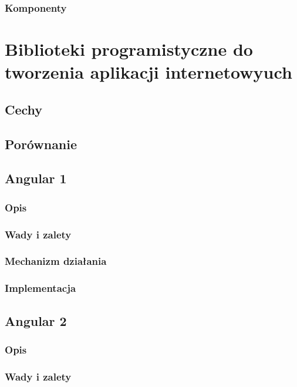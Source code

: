 \documentclass[polish, twoside, 12pt]{mwart}
\let\stdsection\section
\renewcommand*{\section}{\clearpage\stdsection}
\begin{document}
\subsubsection{Komponenty}

\section{Biblioteki programistyczne do tworzenia aplikacji internetowyuch}

\subsection{Cechy}

\subsection{Porównanie}

\subsection{Angular 1}

\subsubsection{Opis}

\subsubsection{Wady i zalety}

\subsubsection{Mechanizm działania}

\subsubsection{Implementacja}

\subsection{Angular 2}

\subsubsection{Opis}

\subsubsection{Wady i zalety}
\end{document}
